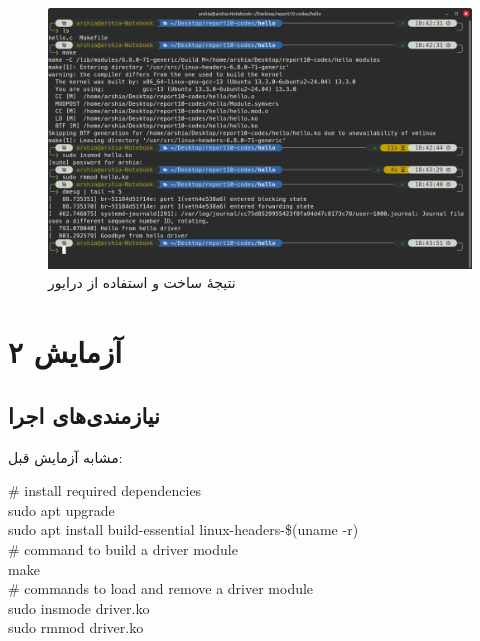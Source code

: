 \documentclass[12pt]{article}
\begin{document}
	\begin{figure}[H]
		\centering
		\includegraphics[width=\textwidth]{report10-resources/screenshots/3.png}
		\caption{نتیجهٔ ساخت و استفاده از درایور}
		\label{img:3}
	\end{figure}
	\newpage
	\section{آزمایش ۲}
	\subsection{نیازمندی‌های اجرا}
	مشابه آزمایش قبل:
	
	\begin{english}
		\noindent
		\# install required dependencies \\
		sudo apt upgrade \\
		sudo apt install build-essential linux-headers-\$(uname -r) \\
		\# command to build a driver module \\
		make \\
		\# commands to load and remove a driver module \\
		sudo insmode driver.ko \\
		sudo rmmod driver.ko
	\end{english}
\end{document}
